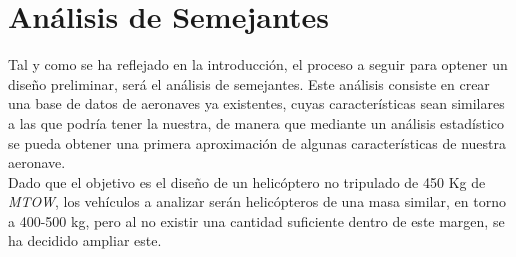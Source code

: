 \thispagestyle{empty}
\chapter{Análisis de Semejantes}

Tal y como se ha reflejado en la introducción, el proceso a seguir para optener un diseño preliminar, será el análisis de semejantes.
Este análisis consiste en crear una base de datos de aeronaves ya existentes, cuyas características sean similares a las que podría tener la nuestra, de manera que mediante un análisis estadístico se pueda obtener una primera aproximación de algunas características de nuestra aeronave.\\

Dado que el objetivo es el diseño de un helicóptero no tripulado de 450 Kg de \emph{MTOW}, los vehículos a analizar serán helicópteros de una masa similar, en torno a 400-500 kg, pero al no existir una cantidad suficiente dentro de este margen, se ha decidido ampliar este.


